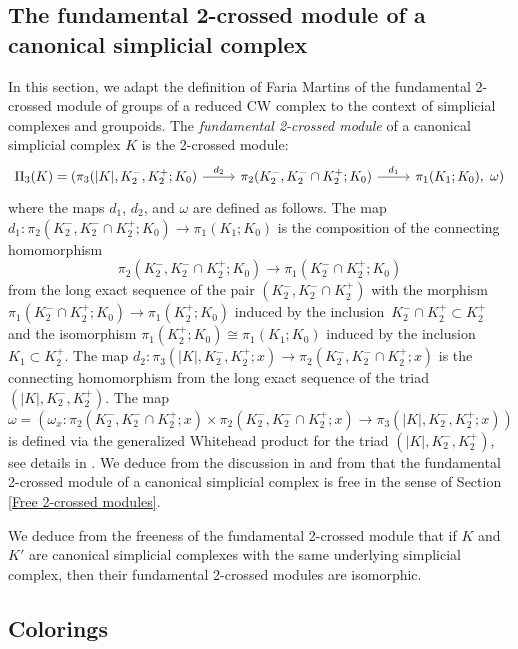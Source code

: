 \documentclass[a4paper, oneside]{amsart}
\numberwithin{equation}{subsection}
\theoremstyle{referencedlemma}
\theoremstyle{plain} %
\theoremstyle{remark}
\begin{document}
\subsection{The fundamental 2-crossed module of a canonical simplicial complex}\label{Section_Fundamental 2-crossed module}
In this section, we adapt the definition of Faria Martins \cite{martins_fundamental_2011} of the fundamental 2-crossed module of groups of a reduced CW complex to the context of simplicial complexes and groupoids. The \emph{fundamental 2-crossed module} of a canonical simplicial complex $K$ is the 2-crossed module:
\[
\begin{tikzcd}
\Pi_3(K) = (\pi_3(\lvert K\rvert , K_2^-, K_2^+; K_0) \arrow[r, "d_2"] & \pi_2(K_2^-, K_2^-\cap K_2^+; K_0) \arrow[r, "d_1"] & \pi_1(K_1; K_0), \ \omega)
\end{tikzcd}
\]
where the maps $d_1$, $d_2$, and $\omega$ are defined as follows. The map $d_1 \colon \pi_2(K_2^-, K_2^-\cap K_2^+; K_0) \to \pi_1(K_1; K_0)$ is the composition of the connecting homomorphism
$$
\pi_2(K_2^-, K_2^-\cap K_2^+; K_0)\to \pi_1(K_2^-\cap K_2^+; K_0)
$$
from the long exact sequence of the pair $(K_2^-, K_2^-\cap K_2^+)$ with the morphism $\pi_1(K_2^- \cap K_2^+; K_0) \to \pi_1(K_2^+; K_0)$ induced by the inclusion~\mbox{$K_2^-\cap K_2^+ \subset K_2^+$} and the isomorphism $\pi_1(K_2^+; K_0) \cong \pi_1(K_1; K_0)$ induced by the inclusion $K_1 \subset K_2^+$. The map $d_2 \colon \pi_3(\lvert K\rvert, K_2^-, K_2^+; x) \to \pi_2(K_2^-, K_2^-\cap K_2^+; x)$ is the connecting homomorphism from the long exact sequence of the triad $(\lvert K \rvert, K_2^-, K_2^+)$.  The map
$$
\omega = \left(\omega_x \colon \pi_2(K_2^-, K_2^-\cap K_2^+; x)\times \pi_2(K_2^-, K_2^-\cap K_2^+; x)\to  \pi_3(\lvert K\rvert, K_2^-, K_2^+; x)\right)
$$
is defined via the generalized Whitehead product for the triad $(\lvert K \rvert, K_2^-, K_2^+)$, see details in \cite[Definition~3.1]{martins_fundamental_2011}.  We deduce from the discussion in \cite[Theorem 2]{ellis_crossed_1993} and from \cite{brown_van_1987} that the fundamental 2-crossed module of a canonical simplicial complex is free in the sense of Section \ref{Free 2-crossed modules}.  

We deduce from the freeness of the fundamental 2-crossed module that if $K$ and $K'$ are canonical simplicial complexes with the same underlying simplicial complex, then their fundamental 2-crossed modules are isomorphic.

\subsection{Colorings}
\end{document}
